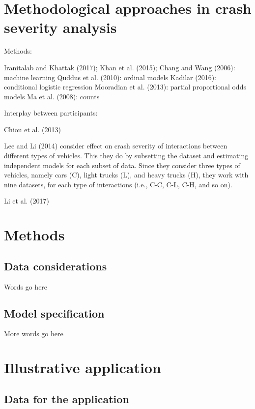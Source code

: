 \documentclass[]{elsarticle} %
\begin{document}
\hypertarget{sec:review-of-methods}{%
\section{Methodological approaches in crash severity
analysis}\label{sec:review-of-methods}}

Methods:

Iranitalab and Khattak (2017); Khan et al. (2015); Chang and Wang
(2006): machine learning Quddus et al. (2010): ordinal models Kadilar
(2016): conditional logistic regression Mooradian et al. (2013): partial
proportional odds models Ma et al. (2008): counts

Interplay between participants:

Chiou et al. (2013)

Lee and Li (2014) consider effect on crash severity of interactions
between different types of vehicles. This they do by subsetting the
dataset and estimating independent models for each subset of data. Since
they consider three types of vehicles, namely cars (C), light trucks
(L), and heavy trucks (H), they work with nine datasets, for each type
of interactions (i.e., C-C, C-L, C-H, and so on).

Li et al. (2017)

\hypertarget{sec:methods}{%
\section{Methods}\label{sec:methods}}

\hypertarget{data-considerations}{%
\subsection{Data considerations}\label{data-considerations}}

Words go here

\hypertarget{model-specification}{%
\subsection{Model specification}\label{model-specification}}

More words go here

\hypertarget{sec:application}{%
\section{Illustrative application}\label{sec:application}}

\hypertarget{data-for-the-application}{%
\subsection{Data for the application}\label{data-for-the-application}}
\end{document}
